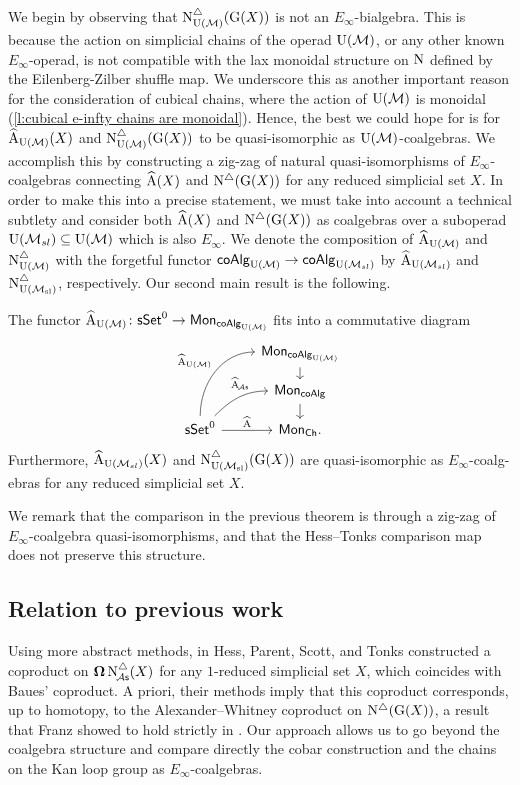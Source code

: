 We begin by observing that $\operatorname{N^{\triangle}_{{\operatorname{U}(\mathcal{M})}}}(\operatorname{G}(X))$ is not an $E_\infty$-bialgebra.
This is because the action on simplicial chains of the operad ${\operatorname{U}(\mathcal{M})}$, or any other known $E_\infty$-operad, is not compatible with the lax monoidal structure on $\operatorname{N}$ defined by the Eilenberg-Zilber shuffle map.
We underscore this as another important reason for the consideration of cubical chains, where the action of ${\operatorname{U}(\mathcal{M})}$ is monoidal (\cref{l:cubical e-infty chains are monoidal}).
Hence, the best we could hope for is for $\operatorname{\widehat{A}_{{\operatorname{U}(\mathcal{M})}}}(X)$ and $\operatorname{N^{\triangle}_{{\operatorname{U}(\mathcal{M})}}}(\operatorname{G}(X))$ to be quasi-isomorphic as ${\operatorname{U}(\mathcal{M})}$-coalgebras.
We accomplish this by constructing a zig-zag of natural quasi-isomorphisms of $E_{\infty}$-coalgebras connecting $\operatorname{\widehat{A}}(X)$ and $\operatorname{N^{\triangle}}(\operatorname{G}(X))$ for any reduced simplicial set $X$.
In order to make this into a precise statement, we must take into account a technical subtlety and consider both $\operatorname{\widehat{A}}(X)$ and $\operatorname{N^{\triangle}}(\operatorname{G}(X))$ as coalgebras over a suboperad ${\operatorname{U}(\mathcal{M}_{sl})} \subseteq {\operatorname{U}(\mathcal{M})}$ which is also $E_\infty$.
We denote the composition of $\operatorname{\widehat{A}_{{\operatorname{U}(\mathcal{M})}}}$ and $\operatorname{N^{\triangle}_{{\operatorname{U}(\mathcal{M})}}}$ with the forgetful functor $\mathsf{coAlg}_{\operatorname{U}(\mathcal{M})} \to \mathsf{coAlg}_{\operatorname{U}(\mathcal{M}_{sl})}$ by $\operatorname{\widehat{A}}_{\operatorname{U}(\mathcal{M}_{sl})}$ and $\operatorname{N^{\triangle}_{{\operatorname{U}(\mathcal{M}_{sl})}}}$, respectively.
Our second main result is the following.

\begin{theorem} \label{t:2nd main thm in the intro}
	The functor $\operatorname{\widehat{A}_{{\operatorname{U}(\mathcal{M})}}} \colon \mathsf{sSet}^0 \to \mathsf{Mon}_{\mathsf{coAlg}_{\operatorname{U}(\mathcal{M})}}$ fits into a commutative diagram
	\[
	\begin{tikzcd}[row sep=small]
	& \Mon_{\coAlg_\UM} \arrow[d] \\
	& \Mon_{\coAlg} \arrow[d] \\
	\sSet^0
	\arrow[r, "\adamsE", ]
	\arrow[ru, "\adamsEA", out=45, in=180, near end]
	\arrow[ruu, "\adamsEUM", out=90, in=180]
	& \Mon_{\Ch}.
	\end{tikzcd}
	\]
	Furthermore, $\operatorname{\widehat{A}}_{\operatorname{U}(\mathcal{M}_{sl})}(X)$ and $\operatorname{N^{\triangle}_{{\operatorname{U}(\mathcal{M}_{sl})}}}(\operatorname{G}(X))$ are quasi-isomorphic as $E_\infty$-coalg-ebras for any reduced simplicial set $X$.
\end{theorem}

We remark that the comparison in the previous theorem is through a zig-zag of $E_\infty$-coalgebra quasi-isomorphisms, and that the Hess--Tonks comparison map does not preserve this structure.

\subsection*{Relation to previous work}

Using more abstract methods, in \cite{hess2006adamshilton} Hess, Parent, Scott, and Tonks constructed a coproduct on $\operatorname{\mathbf{\Omega}} \operatorname{N^{\triangle}_{\!{\mathcal{A}\mathsf{s}}}}(X)$ for any $1$-reduced simplicial set $X$, which coincides with Baues' coproduct.
A priori, their methods imply that this coproduct corresponds, up to homotopy, to the Alexander--Whitney coproduct on $\operatorname{N^{\triangle}}(\operatorname{G}(X))$, a result that Franz showed to hold strictly in \cite{franz2020szczarba}.
Our approach allows us to go beyond the coalgebra structure and compare directly the cobar construction and the chains on the Kan loop group as $E_{\infty}$-coalgebras.

